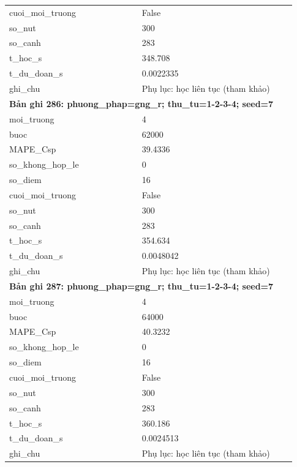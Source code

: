 \begin{longtable}{p{0.43\linewidth}p{0.50\linewidth}}
cuoi\_\allowbreak moi\_\allowbreak truong & False \\
so\_\allowbreak nut & 300 \\
so\_\allowbreak canh & 283 \\
t\_\allowbreak hoc\_\allowbreak s & 348.708 \\
t\_\allowbreak du\_\allowbreak doan\_\allowbreak s & 0.0022335 \\
ghi\_\allowbreak chu & Phụ lục: học liên tục (tham khảo) \\
\midrule
\multicolumn{2}{p{0.95\linewidth}}{\textbf{Bản ghi 286: phuong\_phap=gng\_r; thu\_tu=1-2-3-4; seed=7}} \\
moi\_\allowbreak truong & 4 \\
buoc & 62000 \\
MAPE\_\allowbreak Csp & 39.4336 \\
so\_\allowbreak khong\_\allowbreak hop\_\allowbreak le & 0 \\
so\_\allowbreak diem & 16 \\
cuoi\_\allowbreak moi\_\allowbreak truong & False \\
so\_\allowbreak nut & 300 \\
so\_\allowbreak canh & 283 \\
t\_\allowbreak hoc\_\allowbreak s & 354.634 \\
t\_\allowbreak du\_\allowbreak doan\_\allowbreak s & 0.0048042 \\
ghi\_\allowbreak chu & Phụ lục: học liên tục (tham khảo) \\
\midrule
\multicolumn{2}{p{0.95\linewidth}}{\textbf{Bản ghi 287: phuong\_phap=gng\_r; thu\_tu=1-2-3-4; seed=7}} \\
moi\_\allowbreak truong & 4 \\
buoc & 64000 \\
MAPE\_\allowbreak Csp & 40.3232 \\
so\_\allowbreak khong\_\allowbreak hop\_\allowbreak le & 0 \\
so\_\allowbreak diem & 16 \\
cuoi\_\allowbreak moi\_\allowbreak truong & False \\
so\_\allowbreak nut & 300 \\
so\_\allowbreak canh & 283 \\
t\_\allowbreak hoc\_\allowbreak s & 360.186 \\
t\_\allowbreak du\_\allowbreak doan\_\allowbreak s & 0.0024513 \\
ghi\_\allowbreak chu & Phụ lục: học liên tục (tham khảo) \\

\end{longtable}

